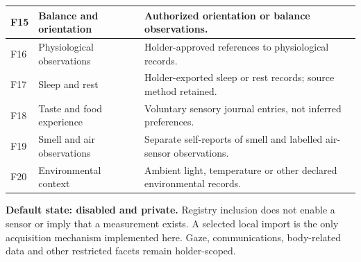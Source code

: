 \documentclass[11pt,a4paper]{article}
\begin{document}
\begin{center}
\begin{tabularx}{\textwidth}{@{}p{}p{}X@{}}
F15 & Balance and orientation & Authorized orientation or balance observations.\\\midrule
F16 & Physiological observations & Holder-approved references to physiological records.\\[5pt]
F17 & Sleep and rest & Holder-exported sleep or rest records; source method retained.\\[5pt]
F18 & Taste and food experience & Voluntary sensory journal entries, not inferred preferences.\\[5pt]
F19 & Smell and air observations & Separate self-reports of smell and labelled air-sensor observations.\\[5pt]
F20 & Environmental context & Ambient light, temperature or other declared environmental records.\\\bottomrule
\end{tabularx}\end{center}

\textbf{Default state: disabled and private.} Registry inclusion does not enable a sensor or imply that a measurement exists. A selected local import is the only acquisition mechanism implemented here. Gaze, communications, body-related data and other restricted facets remain holder-scoped.
\end{document}
